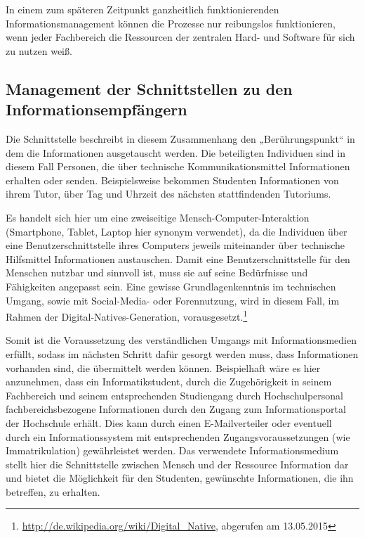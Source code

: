 In einem zum späteren Zeitpunkt ganzheitlich funktionierenden Informationsmanagement 
können die Prozesse nur reibungslos funktionieren, wenn jeder Fachbereich die Ressourcen 
der zentralen Hard- und Software für sich zu nutzen weiß.

\subsection{Management der Schnittstellen zu den Informationsempfängern}
\label{subsection_management_schnittstellen_infoempfangern}
Die Schnittstelle beschreibt in diesem Zusammenhang den „Berührungspunkt“ in dem 
die Informationen ausgetauscht werden. Die beteiligten Individuen sind in diesem Fall 
Personen, die über technische Kommunikationsmittel Informationen erhalten oder senden. 
Beispielsweise bekommen Studenten Informationen von ihrem Tutor, über Tag und Uhrzeit 
des nächsten stattfindenden Tutoriums. 

Es handelt sich hier um eine zweiseitige Mensch-Computer-Interaktion (Smartphone, Tablet, 
Laptop hier synonym verwendet), da die Individuen über eine Benutzerschnittstelle ihres 
Computers jeweils miteinander über technische Hilfsmittel Informationen austauschen.
Damit eine Benutzerschnittstelle für den Menschen nutzbar und sinnvoll ist, muss sie auf 
seine Bedürfnisse und Fähigkeiten angepasst sein. Eine gewisse Grundlagenkenntnis im 
technischen Umgang, sowie mit Social-Media- oder Forennutzung, wird in diesem Fall, 
im Rahmen der Digital-Natives-Generation, vorausgesetzt.\footnote{\url{http://de.wikipedia.org/wiki/Digital_Native}, abgerufen am 13.05.2015} 

Somit ist die Voraussetzung des verständlichen Umgangs mit Informationsmedien erfüllt, 
sodass im nächsten Schritt dafür gesorgt werden muss, dass Informationen vorhanden sind, 
die übermittelt werden können. Beispielhaft wäre es hier anzunehmen, dass ein Informatikstudent, 
durch die Zugehörigkeit in seinem Fachbereich und seinem entsprechenden Studiengang durch 
Hochschulpersonal fachbereichsbezogene Informationen durch den Zugang zum Informationsportal 
der Hochschule erhält. Dies kann durch einen E-Mailverteiler oder eventuell durch ein 
Informationssystem mit entsprechenden Zugangsvoraussetzungen (wie Immatrikulation) gewährleistet 
werden. Das verwendete Informationsmedium stellt hier die Schnittstelle zwischen Mensch und der 
Ressource Information dar und bietet die Möglichkeit für den Studenten, gewünschte Informationen, 
die ihn betreffen, zu erhalten.

